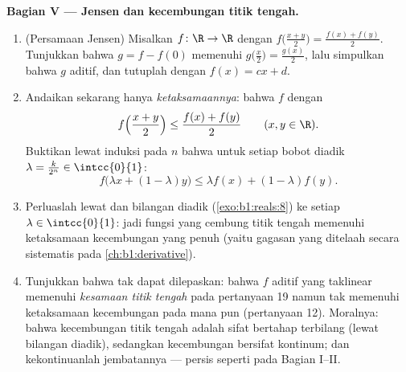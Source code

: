 \begin{problem}[{Soal akhir pekan --- $f(x + y) = f(x) + f(y)$:
keteraturan memaksa kelinearan, beserta potret monsternya}]
\medskip
\noindent\textbf{Bagian V --- Jensen dan kecembungan titik tengah.}
\begin{enumerate}[resume]
  \item (Persamaan Jensen) Misalkan $f \colon \R \to \R$
         dengan $f\bigl(\frac{x+y}{2}\bigr) = \frac{f(x)
        + f(y)}{2}$. Tunjukkan bahwa $g = f - f(0)$ memenuhi
        $g\bigl(\frac x2\bigr) = \frac{g(x)}{2}$, lalu simpulkan bahwa
        $g$ aditif, dan tutuplah dengan $f(x) = cx + d$.
  \item Andaikan sekarang hanya \emph{ketaksamaannya}: bahwa $f$ 
        dengan
        \[
        f\Bigl(\frac{x + y}{2}\Bigr) \leq \frac{f(x) +
        f(y)}{2} \qquad (x, y \in \R).
        \]
        Buktikan lewat induksi pada $n$ bahwa untuk setiap bobot diadik
        $\lambda = \frac{k}{2^n} \in \intcc{0}{1}$:
        \[
        f\bigl(\lambda x + (1 - \lambda)y\bigr) \leq \lambda
        f(x) + (1 - \lambda) f(y) .
        \]
  \item Perluaslah lewat  dan  bilangan diadik
        (\cref{exo:b1:reals:8}) ke setiap $\lambda \in
        \intcc{0}{1}$: jadi fungsi  yang cembung titik tengah
        memenuhi ketaksamaan kecembungan yang penuh (yaitu gagasan
        yang ditelaah secara sistematis pada \cref{ch:b1:derivative}).
  \item Tunjukkan bahwa  tak dapat dilepaskan: bahwa $f$ aditif
        yang taklinear memenuhi \emph{kesamaan titik tengah} pada pertanyaan
        19 namun tak memenuhi ketaksamaan kecembungan pada  mana pun (pertanyaan
        12). Moralnya: bahwa kecembungan titik tengah adalah sifat
        bertahap terbilang (lewat bilangan diadik), sedangkan kecembungan bersifat kontinum;
        dan kekontinuanlah jembatannya --- persis seperti pada Bagian I--II.
\end{enumerate}


\end{problem}
